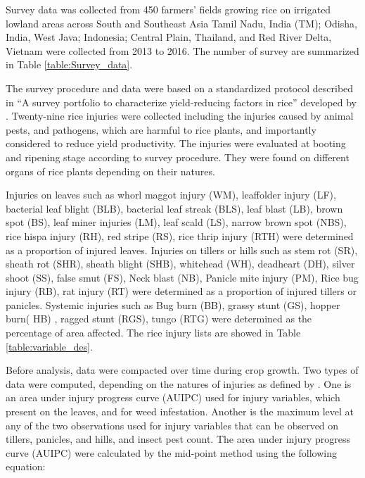 Survey data was collected from 450 farmers’ fields growing rice on irrigated lowland areas across South and Southeast Asia Tamil Nadu, India (TM); Odisha, India, West Java; Indonesia; Central Plain, Thailand, and Red River Delta, Vietnam were collected from 2013 to 2016. The number of survey are summarized in Table \ref{table:Survey_data}.



The survey procedure and data were based on a standardized protocol described in ``A survey portfolio to characterize yield-reducing factors in rice'' developed by \citet{Savary_2009_Survey}. Twenty-nine rice injuries were collected 
including the injuries caused by animal pests, and pathogens, which are harmful to rice plants, and importantly considered to reduce yield productivity. The injuries were evaluated at booting and ripening stage according to survey procedure. They were found on different organs of rice plants depending on their natures. 

Injuries on leaves such as whorl maggot injury (WM), leaffolder injury (LF), bacterial leaf blight (BLB), bacterial leaf streak (BLS), leaf blast (LB), brown spot (BS), leaf miner injuries (LM), leaf scald (LS), narrow brown spot (NBS), rice hispa injury (RH), red stripe (RS), rice thrip injury (RTH) were determined as a proportion of injured leaves. Injuries on tillers or hills such as stem rot (SR), sheath rot (SHR), sheath blight (SHB), whitehead (WH), deadheart (DH), silver shoot (SS), false smut (FS), Neck blast (NB), Panicle mite injury (PM), Rice bug injury (RB), rat injury (RT) were determined as a proportion of injured tillers or panicles. Systemic injuries such as Bug burn (BB), grassy stunt (GS), hopper burn( HB)  , ragged stunt (RGS), tungo (RTG) were determined as the percentage of area affected. The rice injury lists are showed in Table \ref{table:variable_des}.



Before analysis, data were compacted over time during crop growth. Two types of data were computed, depending on the natures of injuries as defined by \citep{Savary_2009_Survey}. One is an area under injury progress curve (AUIPC) used for injury variables, which present on the leaves, and for weed infestation. Another is the maximum level at any of the two observations used for injury variables that can be observed on tillers, panicles, and hills, and insect pest count. The area under injury progress curve (AUIPC) \citep{Campbell_1990_Introduction} were calculated by the mid-point method using the following equation:  


